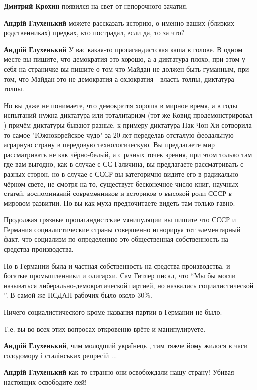\begin{itemize}
\begin{itemize}
\textbf{Дмитрий Крохин} появился на свет от непорочного зачатия.

\textbf{Андрій Глухенький} можете рассказать историю, о именно ваших (близких родственниках) предках, кто пострадал, если да, то за что?


\textbf{Андрій Глухенький} У вас какая-то пропагандистская каша в голове. В
одном месте вы пишите, что демократия это хорошо, а а диктатура плохо, при этом
у себя на страничке вы пишите о том что Майдан не должен быть гуманным, при
том, что Майдан это не демократия а охлократия - власть толпы, диктатура толпы.

Но вы даже не понимаете, что демократия хороша в мирное время, а в годы
испытаний нужна диктатура или тоталитаризм (тот же Ковид продемонстрировал )
причём диктатуры бывают разные, к примеру диктатура Пак Чон Хи сотворила то
самое "Южнокорейское чудо" за 20 лет переделав отсталую феодальную аграрную
страну в передовую технологическую. Вы предлагаете мир рассматривать не как
чёрно-белый, а с разных точек зрения, при этом только там где вам выгодно, как
в случае с СС Галичина, вы предлагаете рассматривать с разных сторон, но в
случае с СССР вы категорично видите его в радикально чёрном свете, не смотря на
то, существует бесконечное число книг, научных статей, воспоминаний
современников и историков о высокой роли СССР в мировом развитии. Но вы как
муха предпочитаете видеть там только гавно.

Продолжая грязные пропагандистские манипуляции вы пишите что СССР и Германия
социалистические страны совершенно игнорируя тот элементарный факт, что
социализм по определению это общественная собственность на средства
производства.

Но в Германии была и частная собственность на средства производства, и богатые
промышленники и олигархи. Сам Гитлер писал, что \enquote{Мы бы могли называться
либерально-демократической партией, но назвались социалистической }. В самой же
НСДАП рабочих было около 30\%.

Ничего социалистического кроме названия партии в Германии не было.

Т.е. вы во всех этих вопросах откровенно врёте и манипулируете.

\textbf{Андрій Глухенький}, чим молодший українець , тим тяжче йому жилося в часи голодомору і сталінських репресій ...

\textbf{Андрій Глухенький} как-то странно они освобождали нашу страну! Убивая настоящих освободите лей!


\end{itemize}
\end{itemize}
